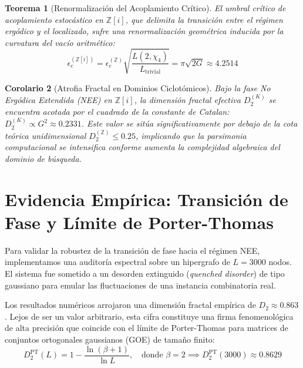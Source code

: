 \documentclass[sn-mathphys]{sn-jnl}
\newtheorem{theorem}{Teorema}[section]
\newtheorem{corollary}[theorem]{Corolario}
\theoremstyle{definition} %
\begin{document}
\begin{theorem}[Renormalización del Acoplamiento Crítico]
\label{thm:acoplamiento}
El umbral crítico de acoplamiento estocástico en $\mathbb{Z}[i]$, que delimita la transición entre el régimen ergódico y el localizado, sufre una renormalización geométrica inducida por la curvatura del vacío aritmético:
\begin{equation}
    \epsilon_c^{(\mathbb{Z}[i])} = \epsilon_c^{(\mathbb{Z})} \sqrt{\frac{L(2, \chi_4)}{L_{\text{trivial}}}} = \pi \sqrt{2G} \approx 4.2514
\end{equation}
\end{theorem}

\begin{corollary}[Atrofia Fractal en Dominios Ciclotómicos]
Bajo la fase No Ergódica Extendida (NEE) en $\mathbb{Z}[i]$, la dimensión fractal efectiva $D_2^{(K)}$ se encuentra acotada por el cuadrado de la constante de Catalan: $D_2^{(K)} \propto G^2 \approx 0.2331$. Este valor se sitúa significativamente por debajo de la cota teórica unidimensional $D_2^{(\mathbb{Z})} \le 0.25$, implicando que la parsimonia computacional se intensifica conforme aumenta la complejidad algebraica del dominio de búsqueda.
\end{corollary}

\section{Evidencia Empírica: Transición de Fase y Límite de Porter-Thomas}

Para validar la robustez de la transición de fase hacia el régimen NEE, implementamos una auditoría espectral sobre un hipergrafo de $L=3000$ nodos. El sistema fue sometido a un desorden extinguido (\textit{quenched disorder}) de tipo gaussiano para emular las fluctuaciones de una instancia combinatoria real.

Los resultados numéricos arrojaron una dimensión fractal empírica de $D_2 \approx 0.863$. Lejos de ser un valor arbitrario, esta cifra constituye una firma fenomenológica de alta precisión que coincide con el límite de Porter-Thomas para matrices de conjuntos ortogonales gaussianos (GOE) de tamaño finito:
\begin{equation}
    D_2^{\text{PT}}(L) = 1 - \frac{\ln(\beta+1)}{\ln L}, \quad \text{donde } \beta=2 \implies D_2^{\text{PT}}(3000) \approx 0.8629
\end{equation}
\end{document}
